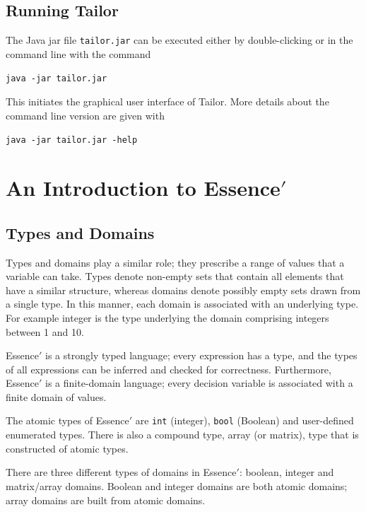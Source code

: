 \documentclass[oneside]{book}
\begin{document}
\subsection{Running {\sc Tailor}}
The Java jar file {\tt tailor.jar} can be executed either 
by double-clicking or in the command line with the command
\begin{center}
{\tt java -jar tailor.jar}
\end{center}
This initiates the graphical user interface of {\sc Tailor}. 
More details about the command line version are given with 
\begin{center}
{\tt java -jar tailor.jar -help}
\end{center}

\section{An Introduction to {\sc Essence}$'$}


\subsection{Types and Domains}

Types and domains play a similar role; they prescribe a range of
values that a variable can take.
Types denote non-empty
sets that contain all elements
that have a similar structure, 
whereas domains denote possibly  empty
sets drawn from a
single type.  In this manner, each domain is associated with an
underlying type.  For example integer is the type underlying the
domain comprising integers between 1 and 10.

{\sc Essence}$'$ is a strongly typed language;
every expression
has a type, and the types of all
expressions can be inferred and checked for correctness.
Furthermore, {\sc Essence}$'$ is a finite-domain language; every decision variable is
associated with a finite domain of values. 


The 
atomic types of {\sc Essence}$'$ are {\tt int} (integer), {\tt bool} (Boolean) and
 user-defined enumerated types. There is also a compound type, array (or matrix),
 type that is constructed of atomic types.


There are three different types of domains in {\sc Essence}$'$:
boolean, integer and matrix/array domains. Boolean and integer 
domains are both atomic domains; array domains are built from 
atomic domains.
\end{document}
